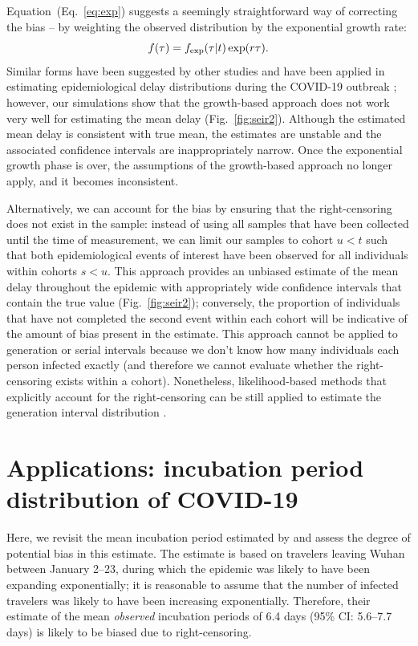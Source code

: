 \documentclass[12pt]{article}
\newcommand{\eref}[1]{(Eq.~\ref{eq:#1})}
\newcommand{\fref}[1]{Fig.~\ref{fig:#1}}
\begin{document}
Equation~\eref{exp} suggests a seemingly straightforward way of correcting the bias -- by weighting the observed distribution by the exponential growth rate:
\begin{equation}
\label{eq:exp}
f(\tau) = f_{\tiny\textrm{exp}}(\tau|t) \exp(r \tau).
\end{equation}
Similar forms have been suggested by other studies \citep{britton2019estimation, park2019inferring} and have been applied in estimating epidemiological delay distributions during the COVID-19 outbreak \citep{nishiura2020serial, linton2020incubation};
however, our simulations show that the growth-based approach does not work very well for estimating the mean delay (\fref{seir2}).
Although the estimated mean delay is consistent with true mean, the estimates are unstable and the associated confidence intervals are inappropriately narrow.
Once the exponential growth phase is over, the assumptions of the growth-based approach no longer apply, and it becomes inconsistent.

Alternatively, we can account for the bias by ensuring that the right-censoring does not exist in the sample:
instead of using all samples that have been collected until the time of measurement, we can limit our samples to cohort $u < t$ such that both epidemiological events of interest have been observed for all individuals within cohorts $s < u$.
This approach provides an unbiased estimate of the mean delay throughout the epidemic with appropriately wide confidence intervals that contain the true value (\fref{seir2});
conversely, the proportion of individuals that have not completed the second event within each cohort will be indicative of the amount of bias present in the estimate.
This approach cannot be applied to generation or serial intervals because we don't know how many individuals each person infected exactly (and therefore we cannot evaluate whether the right-censoring exists within a cohort).
Nonetheless, likelihood-based methods that explicitly account for the right-censoring can be still applied to estimate the generation interval distribution \citep{park2019inferring}.

\section{Applications: incubation period distribution of COVID-19}

Here, we revisit the mean incubation period estimated by \cite{backer2020incubation} and assess the degree of potential bias in this estimate.
The estimate is based on travelers leaving Wuhan between January 2--23, during which the epidemic was likely to have been expanding exponentially; it is reasonable to assume that the number of infected travelers was likely to have been increasing exponentially.
Therefore, their estimate of the mean \emph{observed} incubation periods of 6.4 days (95\% CI: 5.6–7.7 days) is likely to be biased due to right-censoring.
\end{document}
